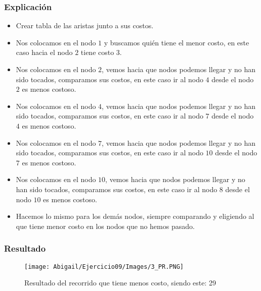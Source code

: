 \documentclass[12pt]{article}
\begin{document}
         \subsubsection{Explicación}
            \begin{itemize}
    
              \item[\checkmark] Crear tabla de las aristas junto a sus costos.
    
              \item[\checkmark] Nos colocamos en el nodo $1$ y buscamos quién tiene el menor costo, en este caso hacia el nodo $2$ tiene costo $3$.
              
              \item[\checkmark] Nos colocamos en el nodo $2$, vemos hacia que nodos podemos llegar y no han sido tocados, comparamos sus costos, en este caso ir al nodo $4$ desde el nodo $2$ es menos costoso.
            
              \item[\checkmark] Nos colocamos en el nodo $4$, vemos hacia que nodos podemos llegar y no han sido tocados, comparamos sus costos, en este caso ir al nodo $7$ desde el nodo $4$ es menos costoso.
              
              \item[\checkmark] Nos colocamos en el nodo $7$, vemos hacia que nodos podemos llegar y no han sido tocados, comparamos sus costos, en este caso ir al nodo $10$ desde el nodo $7$ es menos costoso.
              
               \item[\checkmark] Nos colocamos en el nodo $10$, vemos hacia que nodos podemos llegar y no han sido tocados, comparamos sus costos, en este caso ir al nodo $8$ desde el nodo $10$ es menos costoso.
              
              \item[\checkmark] Hacemos lo mismo para los demás nodos, siempre comparando y eligiendo al que tiene menor costo en los nodos que no hemos pasado.
    
            \end{itemize}
                
      \subsubsection{Resultado}
        \begin{figure}[h!]
          \centering
          \texttt{[image: Abigail/Ejercicio09/Images/3\_PR.PNG]}
          \caption{Resultado del recorrido que tiene menos costo, siendo este: 29}
        \end{figure} 
\end{document}
